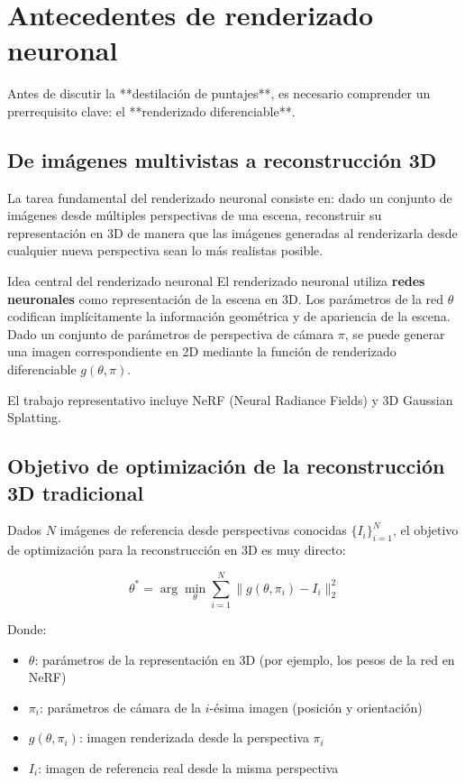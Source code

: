 \section{Antecedentes de renderizado neuronal}

Antes de discutir la **destilación de puntajes**, es necesario comprender un prerrequisito clave: el **renderizado diferenciable**.

\subsection{De imágenes multivistas a reconstrucción 3D}

La tarea fundamental del renderizado neuronal consiste en: dado un conjunto de imágenes desde múltiples perspectivas de una escena, reconstruir su representación en 3D de manera que las imágenes generadas al renderizarla desde cualquier nueva perspectiva sean lo más realistas posible.

\begin{knowledgebox}{Idea central del renderizado neuronal}
El renderizado neuronal utiliza \textbf{redes neuronales} como representación de la escena en 3D. Los parámetros de la red $\theta$ codifican implícitamente la información geométrica y de apariencia de la escena. Dado un conjunto de parámetros de perspectiva de cámara $\pi$, se puede generar una imagen correspondiente en 2D mediante la función de renderizado diferenciable $g(\theta, \pi)$.

El trabajo representativo incluye NeRF (Neural Radiance Fields) y 3D Gaussian Splatting.
\end{knowledgebox}

\subsection{Objetivo de optimización de la reconstrucción 3D tradicional}

Dados $N$ imágenes de referencia desde perspectivas conocidas $\{I_i\}_{i=1}^{N}$, el objetivo de optimización para la reconstrucción en 3D es muy directo:

$$
\theta^* = \arg\min_{\theta} \sum_{i=1}^{N} \| g(\theta, \pi_i) - I_i \|_2^2
$$

Donde:
\begin{itemize}
    \item $\theta$: parámetros de la representación en 3D (por ejemplo, los pesos de la red en NeRF)
    \item $\pi_i$: parámetros de cámara de la $i$-ésima imagen (posición y orientación)
    \item $g(\theta, \pi_i)$: imagen renderizada desde la perspectiva $\pi_i$
    \item $I_i$: imagen de referencia real desde la misma perspectiva
\end{itemize}

